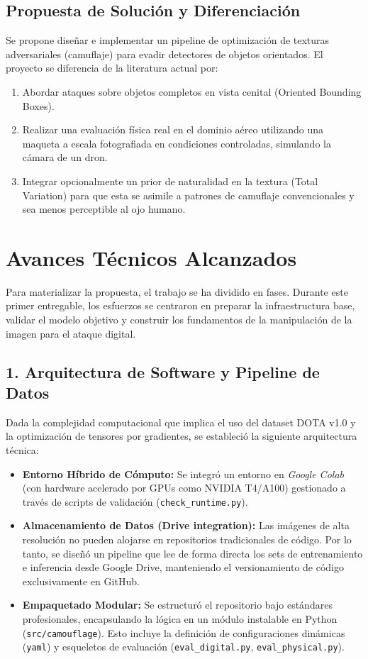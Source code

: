 \documentclass[12pt,a4paper]{article}
\begin{document}
\subsection{Propuesta de Solución y Diferenciación}
Se propone diseñar e implementar un pipeline de optimización de texturas adversariales (camuflaje) para evadir detectores de objetos orientados. El proyecto se diferencia de la literatura actual por:
\begin{enumerate}
    \item Abordar ataques sobre objetos completos en vista cenital (Oriented Bounding Boxes).
    \item Realizar una evaluación física real en el dominio aéreo utilizando una maqueta a escala fotografiada en condiciones controladas, simulando la cámara de un dron.
    \item Integrar opcionalmente un prior de naturalidad en la textura (Total Variation) para que esta se asimile a patrones de camuflaje convencionales y sea menos perceptible al ojo humano.
\end{enumerate}

\section{Avances Técnicos Alcanzados}

Para materializar la propuesta, el trabajo se ha dividido en fases. Durante este primer entregable, los esfuerzos se centraron en preparar la infraestructura base, validar el modelo objetivo y construir los fundamentos de la manipulación de la imagen para el ataque digital.

\subsection{1. Arquitectura de Software y Pipeline de Datos}
Dada la complejidad computacional que implica el uso del dataset DOTA v1.0 y la optimización de tensores por gradientes, se estableció la siguiente arquitectura técnica:
\begin{itemize}
    \item \textbf{Entorno Híbrido de Cómputo:} Se integró un entorno en \textit{Google Colab} (con hardware acelerado por GPUs como NVIDIA T4/A100) gestionado a través de scripts de validación (\texttt{check\_runtime.py}).
    \item \textbf{Almacenamiento de Datos (Drive integration):} Las imágenes de alta resolución no pueden alojarse en repositorios tradicionales de código. Por lo tanto, se diseñó un pipeline que lee de forma directa los sets de entrenamiento e inferencia desde Google Drive, manteniendo el versionamiento de código exclusivamente en GitHub.
    \item \textbf{Empaquetado Modular:} Se estructuró el repositorio bajo estándares profesionales, encapsulando la lógica en un módulo instalable en Python (\texttt{src/camouflage}). Esto incluye la definición de configuraciones dinámicas (\texttt{yaml}) y esqueletos de evaluación (\texttt{eval\_digital.py}, \texttt{eval\_physical.py}).
\end{itemize}
\end{document}
